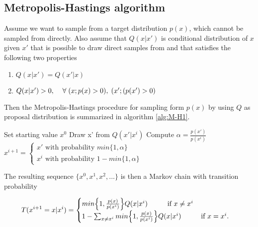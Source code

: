 \subsection{Metropolis-Hastings algorithm}

Assume we want to sample from a target distribution $p(x)$, which cannot be sampled from directly. Also assume that $Q(x|x')$ is conditional distribution of $x$ given $x'$ that is possible to draw direct samples from and that satisfies the following two properties

\begin{enumerate}
    \item $Q(x|x') = Q(x'|x)$
    \item $Q(x|x')>0,   \hspace{4mm} \forall \; (x; p(x)>0), \; (x';(p(x')>0)$
\end{enumerate}

Then the Metropolis-Hastings procedure for sampling form $p(x)$ by using $Q$ as proposal distribution is summarized in algorithm \ref{alg:M-H1}.

\newpage

\begin{algorithm}
\caption{}\label{alg:M-H1}
\begin{algorithmic}
\State Set starting value $x^0$
\State Draw x' from $Q(x'|x^i)$
\State Compute $\alpha = \frac{p(x')}{p(x^i)}$
\State $x^{i+1} = \begin{cases} x' \text{ with probability } min\{ 1, \alpha \}\\ x^i \text{ with probability } 1-min\{ 1, \alpha \}
\end{cases}$
\EndFor
\end{algorithmic}
\end{algorithm}

The resulting sequence $\{  x^0, x^1, x^2,... \}$ is then a Markov chain with transition probability

\begin{equation}
    T(x^{i+1} = x|x^i) = \begin{cases} min \Big \{ 1, \frac{p(x)}{p(x^i)} \Big \} Q(x|x^i) \hspace{1cm} \text{if } x\neq x^i\\
    1-\sum_{x \neq x^i} min \Big \{ 1, \frac{p(x)}{p(x^i)} \Big \} Q(x|x^i) \hspace{1 cm} \text{if } x=x^i.
\end{cases}
\end{equation}

